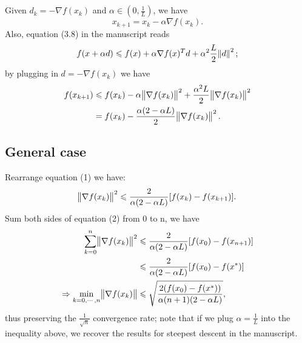 \documentclass[11pt]{article}
\begin{document}
\maketitle
\section{}
Given $d_k = -\nabla f(x_k)$ and $\alpha \in (0,\frac1L)$, we have $$x_{k+1} = x_k - \alpha \nabla f(x_k).$$ Also, equation (3.8) in the manuscript reads $$f(x + \alpha d)\leqslant f(x) +\alpha \nabla f(x)^Td + \alpha^2\frac L2\norm{d}^2;$$
by plugging in $d = -\nabla f(x_k)$ we have 
\begin{equation}\begin{split} 
f(x_{k+1}) &\leqslant f(x_k) - \alpha \norm{\nabla f(x_k)}^2 + \frac{\alpha^2L}2\norm{\nabla f(x_k)}^2 \\
&= f(x_k) - \frac{\alpha(2-\alpha L)}2\norm{\nabla f(x_k)}^2.
\end{split}\end{equation} 
\subsection{General case}
Rearrange equation (1) we have:
\begin{equation}\begin{split}\norm{\nabla f(x_k)}^2\leqslant \frac2{\alpha(2-\alpha L)}[f(x_k) - f(x_{k+1})]. \end{split}\end{equation} 
Sum both sides of equation (2) from 0 to n, we have
\begin{equation}\begin{split}
\sum_{k=0}^{n} \norm{\nabla f(x_k)}^2 &\leqslant \frac2{\alpha(2-\alpha L)}[f(x_0) - f(x_{n+1})]\\
&\leqslant \frac2{\alpha(2-\alpha L)} [f(x_0) - f(x^*)] \\
\Rightarrow \min_{k = 0,\cdots, n}\norm{\nabla f(x_k)} &\leqslant \sqrt{\frac{2(f(x_0) - f(x^*))}{\alpha(n+1)(2-\alpha L)}},
\end{split}\end{equation}  
thus preserving the $\frac1{\sqrt{n}}$ convergence rate; note that if we plug $\alpha = \frac1L$ into the inequality above, we recover the results for steepest descent in the manuscript.
\end{document}
